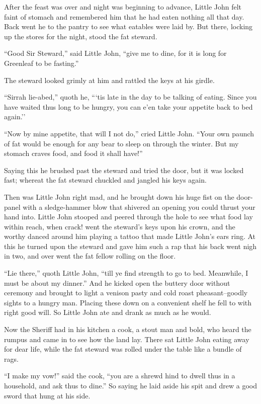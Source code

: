 After the feast was over and night was beginning to advance, Little John
felt faint of stomach and remembered him that he had eaten nothing all
that day. Back went he to the pantry to see what eatables were laid by.
But there, locking up the stores for the night, stood the fat steward.

``Good Sir Steward,'' said Little John, ``give me to dine, for it is
long for Greenleaf to be fasting.''

The steward looked grimly at him and rattled the keys at his girdle.

``Sirrah lie-abed,'' quoth he, ```tis late in the day to be talking of
eating. Since you have waited thus long to be hungry, you can e'en take
your appetite back to bed again.''

``Now by mine appetite, that will I not do,'' cried Little John. ``Your
own paunch of fat would be enough for any bear to sleep on through the
winter. But my stomach craves food, and food it shall have!''

Saying this he brushed past the steward and tried the door, but it was
locked fast; whereat the fat steward chuckled and jangled his keys
again.

Then was Little John right mad, and he brought down his huge fist on the
door-panel with a sledge-hammer blow that shivered an opening you could
thrust your hand into. Little John stooped and peered through the hole
to see what food lay within reach, when crack! went the steward's keys
upon his crown, and the worthy danced around him playing a tattoo that
made Little John's ears ring. At this he turned upon the steward and
gave him such a rap that his back went nigh in two, and over went the
fat fellow rolling on the floor.

``Lie there,'' quoth Little John, ``till ye find strength to go to bed.
Meanwhile, I must be about my dinner.'' And he kicked open the buttery
door without ceremony and brought to light a venison pasty and cold
roast pheasant--goodly sights to a hungry man. Placing these down on a
convenient shelf he fell to with right good will. So Little John ate and
drank as much as he would.

Now the Sheriff had in his kitchen a cook, a stout man and bold, who
heard the rumpus and came in to see how the land lay. There sat Little
John eating away for dear life, while the fat steward was rolled under
the table like a bundle of rags.

``I make my vow!'' said the cook, ``you are a shrewd hind to dwell thus
in a household, and ask thus to dine.'' So saying he laid aside his spit
and drew a good sword that hung at his side.


